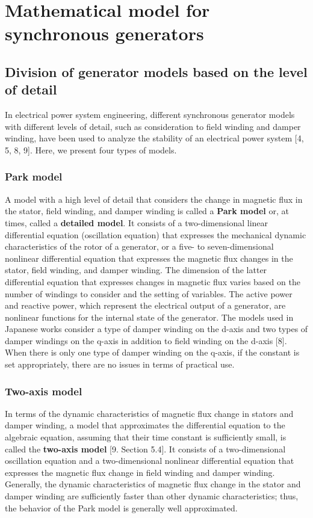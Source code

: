 \documentclass[graybox, envcountchap]{svmult}
\begin{document}
\section{Mathematical model for synchronous generators}\label{sec:genmod}

\subsection{Division of generator models based on the level of detail}

In electrical power system engineering, different synchronous generator models with different levels of detail, such as consideration to field winding and damper winding, have been used to analyze the stability of an electrical power system [4, 5, 8, 9].
Here, we present four types of models.

\smallskip
\subsubsection{Park model}

A model with a high level of detail that considers the change in magnetic flux in the stator, field winding, and damper winding is called a \textbf{Park model} or, at times, called a \textbf{detailed model}.
It consists of a two-dimensional linear differential equation (oscillation equation) that expresses the mechanical dynamic characteristics of the rotor of a generator, or a five- to seven-dimensional nonlinear differential equation that expresses the magnetic flux changes in the stator, field winding, and damper winding.
The dimension of the latter differential equation that expresses changes in magnetic flux varies based on the number of windings to consider and the setting of variables.
The active power and reactive power, which represent the electrical output of a generator, are nonlinear functions for the internal state of the generator.
The models used in Japanese works consider a type of damper winding on the d-axis and two types of damper windings on the q-axis in addition to field winding on the d-axis [8]. 
When there is only one type of damper winding on the q-axis, if the constant is set appropriately, there are no issues in terms of practical use.

\smallskip
\subsubsection{Two-axis model}

In terms of the dynamic characteristics of magnetic flux change in stators and damper winding, a model that approximates the differential equation to the algebraic equation, assuming that their time constant is sufficiently small, is called the \textbf{two-axis model} [9. Section 5.4].
It consists of a two-dimensional oscillation equation and a two-dimensional nonlinear differential equation that expresses the magnetic flux change in field winding and damper winding.
Generally, the dynamic characteristics of magnetic flux change in the stator and damper winding are sufficiently faster than other dynamic characteristics; thus, the behavior of the Park model is generally well approximated.
\end{document}
